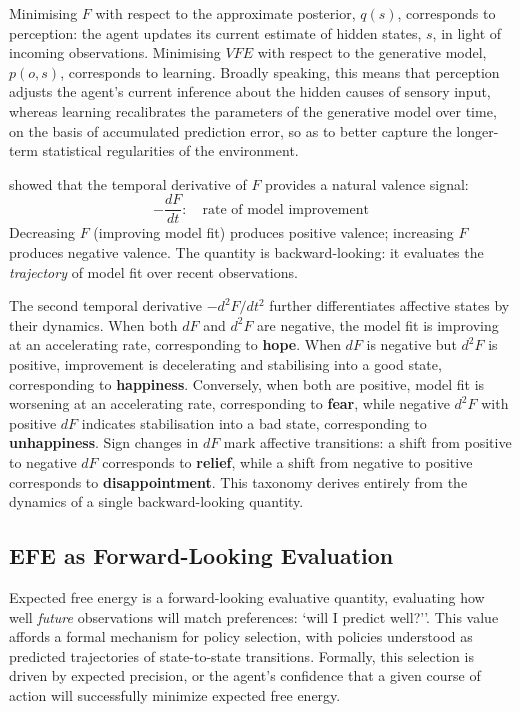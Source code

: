\documentclass[11pt,a4paper]{article}
\newcommand{\rr}{\color{red!70!black}}
\begin{document}
Minimising $F$  with respect to the approximate posterior, $q(s)$, corresponds to perception: the agent updates its current estimate of hidden states, $s$, in light of incoming observations. Minimising $VFE$ with respect to the generative model, $p(o,s)$, corresponds to learning.
{\rr Broadly speaking, this means that perception adjusts the agent’s current inference about the hidden causes of sensory input, whereas learning recalibrates the parameters of the generative model over time, on the basis of accumulated prediction error, so as to better capture the longer-term statistical regularities of the environment.
}


\citet{joffily2013emotional} showed that the temporal derivative of $F$ provides a natural valence signal:
\begin{equation}
    -\frac{dF}{dt}: \quad \text{rate of model improvement}
\end{equation}
Decreasing $F$ (improving model fit) produces positive valence; increasing $F$ produces negative valence. The quantity is backward-looking: it evaluates the \emph{trajectory} of model fit over recent observations.

The second temporal derivative $-d^2F/dt^2$ further differentiates affective states by their dynamics. When both $dF$ and $d^2F$ are negative, the model fit is improving at an accelerating rate, corresponding to \textbf{hope}. When $dF$ is negative but $d^2F$ is positive, improvement is decelerating and stabilising into a good state, corresponding to \textbf{happiness}. Conversely, when both are positive, model fit is worsening at an accelerating rate, corresponding to \textbf{fear}, while negative $d^2F$ with positive $dF$ indicates stabilisation into a bad state, corresponding to \textbf{unhappiness}. Sign changes in $dF$ mark affective transitions: a shift from positive to negative $dF$ corresponds to \textbf{relief}, while a shift from negative to positive corresponds to \textbf{disappointment}. This taxonomy derives entirely from the dynamics of a single backward-looking quantity.






\subsection{EFE as Forward-Looking Evaluation}\label{sec:efe}

Expected free energy is a forward-looking evaluative quantity, evaluating  how well \emph{future} observations will match preferences: `will I predict well?''. {\rr This value affords a formal mechanism for policy selection, with policies understood as predicted trajectories of state-to-state transitions. Formally, this selection is driven by expected precision, or the agent's confidence that a given course of action will successfully minimize expected free energy.}
\end{document}
